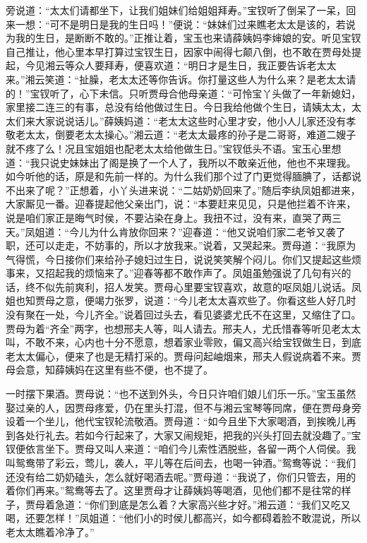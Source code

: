 \begin{parag}
旁说道：“太太们请都坐下，让我们姐妹们给姐姐拜寿。”宝钗听了倒呆了一呆，回来一想：“可不是明日是我的生日吗！”便说：“妹妹们过来瞧老太太是该的，若说为我的生日，是断断不敢的。”正推让着，宝玉也来请薛姨妈李婶娘的安。听见宝钗自己推让，他心里本早打算过宝钗生日，因家中闹得七颠八倒，也不敢在贾母处提起，今见湘云等众人要拜寿，便喜欢道：“明日才是生日，我正要告诉老太太来。”湘云笑道：“扯臊，老太太还等你告诉。你打量这些人为什么来？是老太太请的！”宝钗听了，心下未信。只听贾母合他母亲道：“可怜宝丫头做了一年新媳妇，家里接二连三的有事，总没有给他做过生日。今日我给他做个生日，请姨太太，太太们来大家说说话儿。”薛姨妈道：“老太太这些时心里才安，他小人儿家还没有孝敬老太太，倒要老太太操心。”湘云道：“老太太最疼的孙子是二哥哥，难道二嫂子就不疼了么！况且宝姐姐也配老太太给他做生日。”宝钗低头不语。宝玉心里想道：“我只说史妹妹出了阁是换了一个人了，我所以不敢亲近他，他也不来理我。如今听他的话，原是和先前一样的。为什么我们那个过了门更觉得腼腆了，话都说不出来了呢？”正想着，小丫头进来说：“二姑奶奶回来了。”随后李纨凤姐都进来，大家厮见一番。迎春提起他父亲出门，说：“本要赶来见见，只是他拦着不许来，说是咱们家正是晦气时侯，不要沾染在身上。我扭不过，没有来，直哭了两三天。”凤姐道：“今儿为什么肯放你回来？”迎春道：“他又说咱们家二老爷又袭了职，还可以走走，不妨事的，所以才放我来。”说着，又哭起来。贾母道：“我原为气得慌，今日接你们来给孙子媳妇过生日，说说笑笑解个闷儿。你们又提起这些烦事来，又招起我的烦恼来了。”迎春等都不敢作声了。凤姐虽勉强说了几句有兴的话，终不似先前爽利，招人发笑。贾母心里要宝钗喜欢，故意的呕凤姐儿说话。凤姐也知贾母之意，便竭力张罗，说道：“今儿老太太喜欢些了。你看这些人好几时没有聚在一处，今儿齐全。”说着回过头去，看见婆婆尤氏不在这里，又缩住了口。贾母为着“齐全”两字，也想邢夫人等，叫人请去。邢夫人，尤氏惜春等听见老太太叫，不敢不来，心内也十分不愿意，想着家业零败，偏又高兴给宝钗做生日，到底老太太偏心，便来了也是无精打采的。贾母问起岫烟来，邢夫人假说病着不来。贾母会意，知薛姨妈在这里有些不便，也不提了。
\end{parag}


\begin{parag}
    一时摆下果酒。贾母说：“也不送到外头，今日只许咱们娘儿们乐一乐。”宝玉虽然娶过亲的人，因贾母疼爱，仍在里头打混，但不与湘云宝琴等同席，便在贾母身旁设着一个坐儿，他代宝钗轮流敬酒。贾母道：“如今且坐下大家喝酒，到挨晚儿再到各处行礼去。若如今行起来了，大家又闹规矩，把我的兴头打回去就没趣了。”宝钗便依言坐下。贾母又叫人来道：“咱们今儿索性洒脱些，各留一两个人伺侯。我叫鸳鸯带了彩云，莺儿，袭人，平儿等在后间去，也喝一钟酒。”鸳鸯等说：“我们还没有给二奶奶磕头，怎么就好喝酒去呢。”贾母道：“我说了，你们只管去，用的着你们再来。”鸳鸯等去了。这里贾母才让薛姨妈等喝酒，见他们都不是往常的样子，贾母着急道：“你们到底是怎么着？大家高兴些才好。”湘云道：“我们又吃又喝，还要怎样！”凤姐道：“他们小的时侯儿都高兴，如今都碍着脸不敢混说，所以老太太瞧着冷净了。”
\end{parag}



